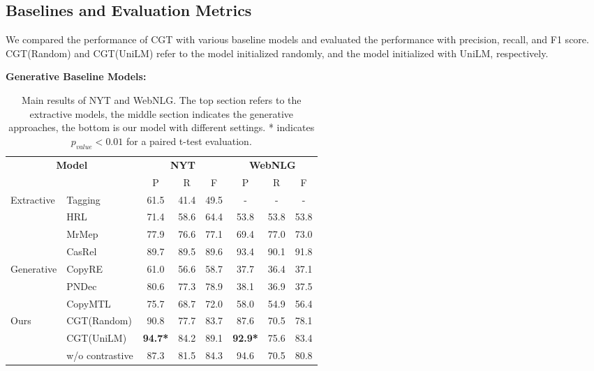 \documentclass[letterpaper]{article} \usepackage{aaai21}  \usepackage{times}  \usepackage{helvet} \usepackage{courier}  \usepackage[hyphens]{url}  \usepackage{graphicx} \urlstyle{rm} \def\UrlFont{\rm}  \usepackage{natbib}  \usepackage[noend]{algpseudocode}
\begin{document}
\subsection{Baselines and Evaluation Metrics}
We compared the performance of CGT with various baseline models and evaluated the performance with precision, recall, and F1 score. CGT(Random) and CGT(UniLM) refer to the model initialized randomly, and the model initialized with UniLM, respectively.

\textbf{Generative Baseline Models:}

\begin{table*}[h] \centering
\begin{tabular}{ll|ccc|ccc}
 \toprule
 \multicolumn{2}{c|}{\multirow{2}{*}{\textbf{Model}}}& \multicolumn{3}{c|}{\textbf{NYT}} & \multicolumn{3}{c}{\textbf{WebNLG}} \\
\cline{3-8}
&& P & R & F & P & R & F  \\
 \midrule
   \multirow{4}{*}{Extractive}    &  Tagging \cite{DBLP:journals/corr/ZhengWBHZX17}& 61.5 &41.4 &49.5 &- & - &- \\
       & HRL\cite{takanobu2019hierarchical} & 71.4 & 58.6 & 64.4 & 53.8& 53.8 &53.8  \\
      & MrMep \cite{chen2019mrmep} &77.9  &76.6  &77.1  &69.4 &77.0  &73.0  \\
      & CasRel \cite{wei2020novel}  &89.7 &89.5 &89.6 &93.4  &90.1  &91.8  \\
       \midrule
   \multirow{3}{*}{Generative}   &  CopyRE \cite{zeng2018extracting} & 61.0& 56.6& 58.7 &37.7& 36.4& 37.1 \\
       & PNDec \cite{nayak2019effective} & 80.6& 77.3& 78.9 &38.1& 36.9& 37.5 \\
    &    CopyMTL  \cite{zeng2020copymtl}   &75.7  &68.7  &72.0  &58.0 &54.9 &56.4  \\
\midrule
\multirow{3}{*}{Ours}& CGT(Random) & 90.8  & 77.7  & 83.7 &87.6 &70.5  &78.1 \\ 
& CGT(UniLM) & \textbf{94.7*} & 84.2 & 89.1  & \textbf{92.9*}   & 75.6   & 83.4  \\
& w/o contrastive&87.3 &81.5 &84.3 &94.6 &70.5 &80.8\\
 \bottomrule
\end{tabular}
\caption{Main results of NYT and WebNLG. The top section refers to the extractive models, the middle section indicates the generative approaches, the bottom is our model with different settings. * indicates $p_{value} < 0.01$ for a paired t-test evaluation.}
\label{nyt}
\end{table*}
\end{document}
